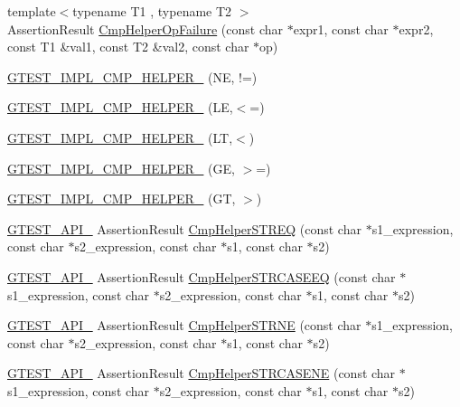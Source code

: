 \begin{DoxyCompactItemize}
{\footnotesize template$<$typename T1 , typename T2 $>$ }\\Assertion\+Result \hyperlink{namespacetesting_1_1internal_a894ffccd936d78fd555f490020c27f0a}{Cmp\+Helper\+Op\+Failure} (const char $\ast$expr1, const char $\ast$expr2, const T1 \&val1, const T2 \&val2, const char $\ast$op)
\item 
\hyperlink{namespacetesting_1_1internal_aa14e3caa94126d7fb8e06bfb3d24ae4a}{G\+T\+E\+S\+T\+\_\+\+I\+M\+P\+L\+\_\+\+C\+M\+P\+\_\+\+H\+E\+L\+P\+E\+R\+\_\+} (NE, !=)
\item 
\hyperlink{namespacetesting_1_1internal_ade60646b18728043fff84d7b4125de2c}{G\+T\+E\+S\+T\+\_\+\+I\+M\+P\+L\+\_\+\+C\+M\+P\+\_\+\+H\+E\+L\+P\+E\+R\+\_\+} (LE,$<$=)
\item 
\hyperlink{namespacetesting_1_1internal_aabcbff15eac496f8487699d19f42c274}{G\+T\+E\+S\+T\+\_\+\+I\+M\+P\+L\+\_\+\+C\+M\+P\+\_\+\+H\+E\+L\+P\+E\+R\+\_\+} (LT,$<$)
\item 
\hyperlink{namespacetesting_1_1internal_af969886067930ce70f6405cd5aa8b06b}{G\+T\+E\+S\+T\+\_\+\+I\+M\+P\+L\+\_\+\+C\+M\+P\+\_\+\+H\+E\+L\+P\+E\+R\+\_\+} (GE, $>$=)
\item 
\hyperlink{namespacetesting_1_1internal_a7fdb4fc164db83c51dfad17640bfeae9}{G\+T\+E\+S\+T\+\_\+\+I\+M\+P\+L\+\_\+\+C\+M\+P\+\_\+\+H\+E\+L\+P\+E\+R\+\_\+} (GT, $>$)
\item 
\hyperlink{gtest-port_8h_aa73be6f0ba4a7456180a94904ce17790}{G\+T\+E\+S\+T\+\_\+\+A\+P\+I\+\_\+} Assertion\+Result \hyperlink{namespacetesting_1_1internal_a93eb9d61cac7faf1faff6301ae5f4a46}{Cmp\+Helper\+S\+T\+R\+EQ} (const char $\ast$s1\+\_\+expression, const char $\ast$s2\+\_\+expression, const char $\ast$s1, const char $\ast$s2)
\item 
\hyperlink{gtest-port_8h_aa73be6f0ba4a7456180a94904ce17790}{G\+T\+E\+S\+T\+\_\+\+A\+P\+I\+\_\+} Assertion\+Result \hyperlink{namespacetesting_1_1internal_a00c3d012df6173622ef558a131bfb95d}{Cmp\+Helper\+S\+T\+R\+C\+A\+S\+E\+EQ} (const char $\ast$s1\+\_\+expression, const char $\ast$s2\+\_\+expression, const char $\ast$s1, const char $\ast$s2)
\item 
\hyperlink{gtest-port_8h_aa73be6f0ba4a7456180a94904ce17790}{G\+T\+E\+S\+T\+\_\+\+A\+P\+I\+\_\+} Assertion\+Result \hyperlink{namespacetesting_1_1internal_a6b485231a046ff760844a0321c04870b}{Cmp\+Helper\+S\+T\+R\+NE} (const char $\ast$s1\+\_\+expression, const char $\ast$s2\+\_\+expression, const char $\ast$s1, const char $\ast$s2)
\item 
\hyperlink{gtest-port_8h_aa73be6f0ba4a7456180a94904ce17790}{G\+T\+E\+S\+T\+\_\+\+A\+P\+I\+\_\+} Assertion\+Result \hyperlink{namespacetesting_1_1internal_a5f74b933606b0a742cd5a8ad2d7087e0}{Cmp\+Helper\+S\+T\+R\+C\+A\+S\+E\+NE} (const char $\ast$s1\+\_\+expression, const char $\ast$s2\+\_\+expression, const char $\ast$s1, const char $\ast$s2)

\end{DoxyCompactItemize}
